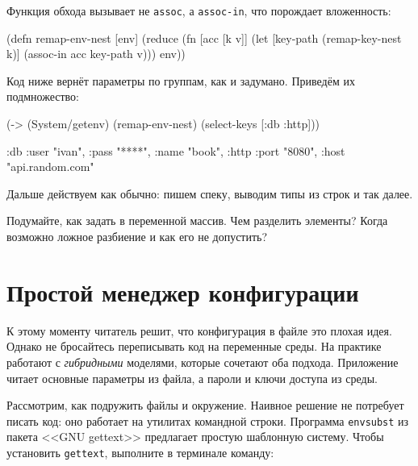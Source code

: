 
\noindent
Функция обхода вызывает не \verb|assoc|, а \verb|assoc-in|, что порождает
вложенность:

\begin{english}
  \begin{clojure}
(defn remap-env-nest
  [env]
  (reduce
   (fn [acc [k v]]
     (let [key-path (remap-key-nest k)]
       (assoc-in acc key-path v)))
   {}
   env))
  \end{clojure}
\end{english}

Код ниже вернёт параметры по группам, как и задумано. Приведём их подмножество:

\begin{english}
  \begin{clojure}
(-> (System/getenv)
    (remap-env-nest)
    (select-keys [:db :http]))

{:db {:user "ivan", :pass "****", :name "book"},
 :http {:port "8080", :host "api.random.com"}}
  \end{clojure}
\end{english}

\noindent
Дальше действуем как обычно: пишем спеку, выводим типы из строк и так далее.

Подумайте, как задать в переменной массив. Чем разделить элементы? Когда
возможно ложное разбиение и как его не допустить?

\section{Простой менеджер конфигурации}


К этому моменту читатель решит, что конфигурация в файле это плохая идея. Однако
не бросайтесь переписывать код на переменные среды. На практике работают с
\emph{гибридными} моделями, которые сочетают оба подхода. Приложение читает
основные параметры из файла, а пароли и ключи доступа из среды.


Рассмотрим, как подружить файлы и окружение. Наивное решение не потребует писать
код: оно работает на утилитах командной строки. Программа \verb|envsubst| из
пакета <<GNU gettext>> предлагает простую шаблонную систему. Чтобы установить
\verb|gettext|, выполните в терминале команду:


